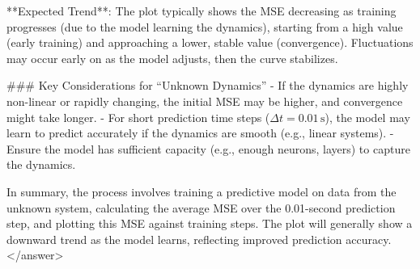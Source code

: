 **Expected Trend**: The plot typically shows the MSE decreasing as training progresses (due to the model learning the dynamics), starting from a high value (early training) and approaching a lower, stable value (convergence). Fluctuations may occur early on as the model adjusts, then the curve stabilizes.  


### Key Considerations for “Unknown Dynamics”  
- If the dynamics are highly non-linear or rapidly changing, the initial MSE may be higher, and convergence might take longer.  
- For short prediction time steps (\( \Delta t = 0.01 \, \text{s} \)), the model may learn to predict accurately if the dynamics are smooth (e.g., linear systems).  
- Ensure the model has sufficient capacity (e.g., enough neurons, layers) to capture the dynamics.  


In summary, the process involves training a predictive model on data from the unknown system, calculating the average MSE over the 0.01-second prediction step, and plotting this MSE against training steps. The plot will generally show a downward trend as the model learns, reflecting improved prediction accuracy.</answer>
